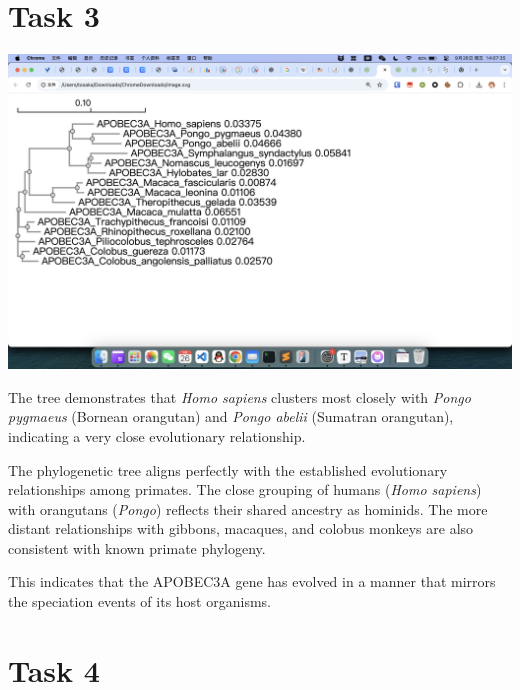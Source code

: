 \documentclass{article}
\begin{document}
\section{Task 3}

\begin{center}
    \includegraphics[width=1\textwidth]{../images/task3/image1.png}
\end{center}

The tree demonstrates that \textit{Homo sapiens} clusters most closely with \textit{Pongo pygmaeus} (Bornean orangutan) and \textit{Pongo abelii} (Sumatran orangutan), indicating a very close evolutionary relationship.

The phylogenetic tree aligns perfectly with the established evolutionary relationships among primates. The close grouping of humans (\textit{Homo sapiens}) with orangutans (\textit{Pongo}) reflects their shared ancestry as hominids. The more distant relationships with gibbons, macaques, and colobus monkeys are also consistent with known primate phylogeny.

This indicates that the APOBEC3A gene has evolved in a manner that mirrors the speciation events of its host organisms.

\section{Task 4}
\end{document}
